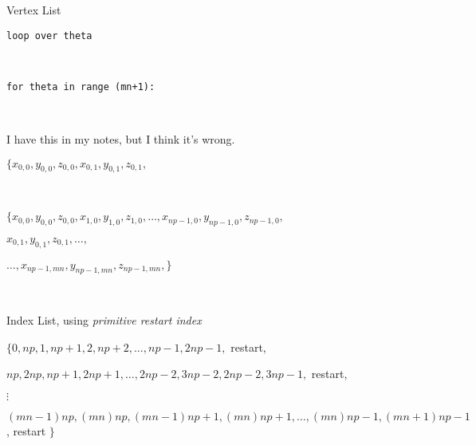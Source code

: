 Vertex List 

{\tt loop over theta}


\

{\tt for theta in range (mn+1):}


\qquad {}

\

{\color{red}  I have this in my notes, but I think it's wrong. 

$\{ 
	x_{0,0}, y_{0,0}, z_{0,0},
	x_{0,1}, y_{0,1}, z_{0,1},
$
}

\

$\{ 
	x_{0,0}, y_{0,0}, z_{0,0},
	x_{1,0}, y_{1,0}, z_{1,0},
	\dots,
	x_{np-1,0}, y_{np-1,0}, z_{np-1,0},
$

\qquad$
	x_{0,1}, y_{0,1}, z_{0,1},
	\dots,
$

\qquad \qquad $
	\dots, x_{np-1,mn}, y_{np-1,mn}, z_{np-1,mn},
\}$

\

Index List, using {\it primitive restart index}

$\{ 0, np, 1, np+1, 2, np+2, \dots, np-1, 2np-1, $ restart,

$np, 2np, np+1, 2np+1, \dots, 2np-2, 3np-2, 2np-2, 3np-1,$ restart,

$\vdots$

$(mn-1)np, (mn)np, (mn-1)np + 1, (mn)np+1, \dots, (mn)np-1, (mn+1)np - 1$, restart $\}$







